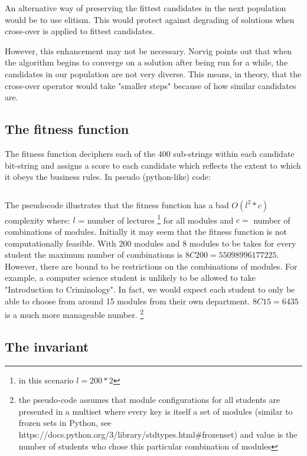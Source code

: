 \documentclass[a4paper, 12pt, titlepage]{article}
\begin{document}
An alternative way of preserving the fittest candidates in the next
population would be to use elitism. This would protect against degrading
of solutions when cross-over is applied to fittest candidates.
\cite[p.~26]{floreano2008}

However, this enhancement may not be necessary. Norvig
\cite[p.~128]{norvig2010} points out that when the algorithm begins to
converge on a solution after being run for a while, the candidates in
our population are not very diverse. This means, in theory, that the
cross-over operator would take "smaller steps" because of how similar
candidates are.

\subsection*{The fitness function}

The fitness function deciphers each of the \(400\) sub-strings within each
candidate bit-string and assigns a score to each candidate which reflects
the extent to which it obeys the business rules. \cite[p.~22]{floreano2008} 
In pseudo (python-like) code: 

\inputminted{python}{fitness.py}

The pseudocode illustrates that the fitness function has a bad \(O(l^2 *
c)\) complexity where: \(l\) = number of lectures \footnote{in this
scenario \(l = 200 * 2\)} for all modules and \( c = \) number of
combinations of modules.  Initially it may seem that the fitness function
is not computationally feasible.  With 200 modules and 8 modules to be
takes for every student the maximum number of combinations is \(8C200 =
55098996177225\). However, there are bound to be restrictions on the
combinations of modules. For example, a computer science student is
unlikely to be allowed to take "Introduction to Criminology". In fact, we
would expect each student to only be able to choose from around 15 modules
from their own department. \(8C15 = 6435\) is a much more manageable number.
\footnote{the pseudo-code assumes that module configurations for all students are presented
in a multiset where every key is itself a set of modules (similar to frozen sets in
Python, see https://docs.python.org/3/library/stdtypes.html#frozenset)
and value is the number of students who chose this particular combination of modules}

\subsection*{The invariant}
\end{document}

